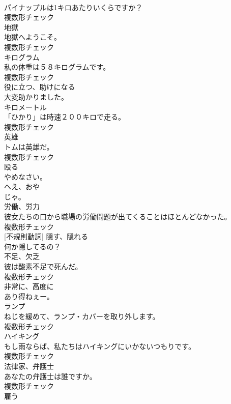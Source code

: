 \documentclass[8pt]{extreport}
\begin{document}
\begin{CJK}{UTF8}{min}
\\	パイナップルは1キロあたりいくらですか？	
\\	複数形チェック
\\	[名詞]	地獄	
\\	地獄へようこそ。	
\\	複数形チェック
\\	[名詞]	キログラム	
\\	私の体重は５８キログラムです。	
\\	複数形チェック
\\	[形容詞]	役に立つ、助けになる	
\\	大変助かりました。	
\\	[名詞]	キロメートル	
\\	「ひかり」は時速２００キロで走る。	
\\	複数形チェック
\\	[名詞]	英雄	
\\	トムは英雄だ。	
\\	複数形チェック
\\	[動詞]	殴る	
\\	やめなさい。	
\\	[感動詞]	へえ、おや	
\\	じゃ。	
\\	[名詞]	労働、労力	
\\	彼女たちの口から職場の労働問題が出てくることはほとんどなかった。	
\\	複数形チェック
\\	[動詞] [不規則動詞]	隠す、隠れる	
\\	何か隠してるの？	
\\	[名詞]	不足、欠乏	
\\	彼は酸素不足で死んだ。	
\\	複数形チェック
\\	[副詞]	非常に、高度に	
\\	あり得ねぇー。	
\\	[名詞]	ランプ	
\\	ねじを緩めて、ランプ・カバーを取り外します。	
\\	複数形チェック
\\	[名詞]	ハイキング	
\\	もし雨ならば、私たちはハイキングにいかないつもりです。	
\\	複数形チェック
\\	[名詞]	法律家、弁護士	
\\	あなたの弁護士は誰ですか。	
\\	複数形チェック
\\	[動詞]	雇う	

\end{CJK}
\end{document}
